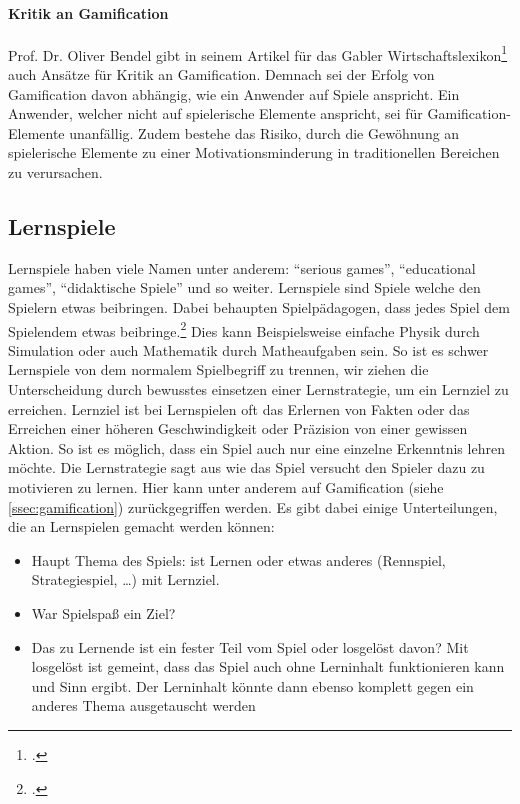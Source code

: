     \paragraph{Kritik an Gamification}
    Prof. Dr. Oliver Bendel gibt in seinem Artikel für das Gabler Wirtschaftslexikon\footcite{gabler-gamification} auch Ansätze für Kritik an Gamification. Demnach sei der Erfolg von Gamification davon abhängig, wie ein Anwender auf Spiele anspricht. Ein Anwender, welcher nicht auf spielerische Elemente anspricht, sei für Gamification-Elemente unanfällig. Zudem bestehe das Risiko, durch die Gewöhnung an spielerische Elemente zu einer Motivationsminderung in traditionellen Bereichen zu verursachen.

\subsection{Lernspiele}
	Lernspiele haben viele Namen unter anderem: \enquote{serious games}, \enquote{educational games}, \enquote{didaktische Spiele} und so weiter.
	Lernspiele sind Spiele welche den Spielern etwas beibringen. Dabei behaupten Spielpädagogen, dass jedes Spiel dem Spielendem etwas beibringe.\footcite{lernspiel} Dies kann Beispielsweise einfache Physik durch Simulation oder auch Mathematik durch Matheaufgaben sein. So ist es schwer Lernspiele von dem normalem Spielbegriff zu trennen, wir ziehen die Unterscheidung durch bewusstes einsetzen einer Lernstrategie, um ein Lernziel zu erreichen.
	Lernziel ist bei Lernspielen oft das Erlernen von Fakten oder das Erreichen einer höheren Geschwindigkeit oder Präzision von einer gewissen Aktion. So ist es möglich, dass ein Spiel auch nur eine einzelne Erkenntnis lehren möchte.
	Die Lernstrategie sagt aus wie das Spiel versucht den Spieler dazu zu motivieren zu lernen. Hier kann unter anderem auf Gamification (siehe \ref{ssec:gamification}) zurückgegriffen werden.
	Es gibt dabei einige Unterteilungen, die an Lernspielen gemacht werden können:
	\begin{itemize}
		\item{ Haupt Thema des Spiels: ist Lernen oder etwas anderes (Rennspiel, Strategiespiel, \dots) mit Lernziel. }
		\item{ War Spielspaß ein Ziel? }
		\item{ Das zu Lernende ist ein fester Teil vom Spiel oder losgelöst davon? Mit losgelöst ist gemeint, dass das Spiel auch ohne Lerninhalt funktionieren kann und Sinn ergibt. Der Lerninhalt könnte dann ebenso komplett gegen ein anderes Thema ausgetauscht werden }
	\end{itemize}
